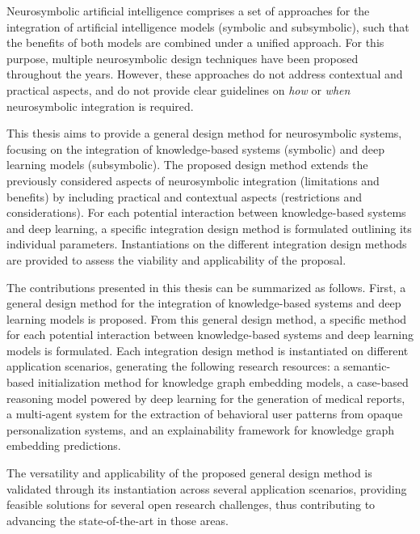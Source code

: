 


\begin{abstractslong}    
Neurosymbolic artificial intelligence comprises a set of approaches for the integration of artificial intelligence models (symbolic and subsymbolic), such that the benefits of both models are combined under a unified approach. For this purpose, multiple neurosymbolic design techniques have been proposed throughout the years. However, these approaches do not address contextual and practical aspects, and do not provide clear guidelines on \textit{how} or \textit{when} neurosymbolic integration is required.

This thesis aims to provide a general design method for neurosymbolic systems, focusing on the integration of knowledge-based systems (symbolic) and deep learning models (subsymbolic). The proposed design method extends the previously considered aspects of neurosymbolic integration (limitations and benefits) by including practical and contextual aspects (restrictions and considerations). For each potential interaction between knowledge-based systems and deep learning, a specific integration design method is formulated outlining its individual parameters. Instantiations on the different integration design methods are provided to assess the viability and applicability of the proposal. 

The contributions presented in this thesis can be summarized as follows. First, a general design method for the integration of knowledge-based systems and deep learning models is proposed. From this general design method, a specific method for each potential interaction between knowledge-based systems and deep learning models is formulated. Each integration design method is instantiated on different application scenarios, generating the following research resources: a semantic-based initialization method for knowledge graph embedding models, a case-based reasoning model powered by deep learning for the generation of medical reports, a multi-agent system for the extraction of behavioral user patterns from opaque personalization systems, and an explainability framework for knowledge graph embedding predictions.

The versatility and applicability of the proposed general design method is validated through its instantiation across several application scenarios, providing feasible solutions for several open research challenges, thus contributing to advancing the state-of-the-art in those areas.

\end{abstractslong}


